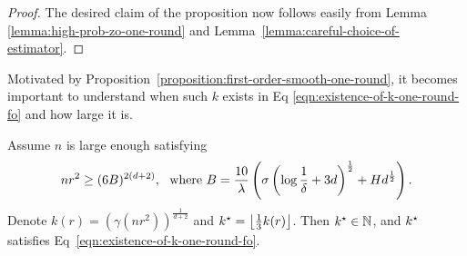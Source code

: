 \begin{proof}
The desired claim of the proposition now follows easily from Lemma
\ref{lemma:high-prob-zo-one-round} and Lemma~\ref{lemma:careful-choice-of-estimator}.
\end{proof}

Motivated by Proposition~\ref{proposition:first-order-smooth-one-round}, 
it becomes important to understand when such $k$ exists in Eq 
\eqref{eqn:existence-of-k-one-round-fo} and how large it is. 

\begin{lemma}
\label{lemma:ef-first-order-smooth-one-round}
Assume $n$ is large enough satisfying 
\begin{equation}
\label{eqn:ef-n-condition-fo-smooth-one-round}
nr^2 \geq (6B)^{2(d+2)},~~\text{where}~
	B =  \frac{10}{\lambda} \left(\sigma \left(\log \frac{1}{\delta} + 3d\right)^{\frac{1}{2}}+Hd^{\frac{1}{2}}\right).
\end{equation}
Denote $k(r)= \left(\gamma\left(nr^2\right)\right)^\frac{1}{d+2}$
and $k^\star = \left\lfloor{\frac{1}{3} k(r)}\right\rfloor$. Then $k^\star\in \mathbb{N}$,
and $k^\star$ satisfies Eq~\eqref{eqn:existence-of-k-one-round-fo}.
\end{lemma}


